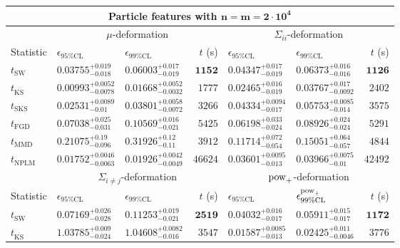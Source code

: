 \begin{tabular}{l|llr|llr}
	\toprule
	\multicolumn{7}{c}{{\bf Particle features with $\mathbf{n=m=2\cdot 10^{4}}$}} \\
	\toprule
	\multicolumn{1}{c}{} & \multicolumn{3}{c}{$\mu$-deformation} & \multicolumn{3}{c}{$\Sigma_{ii}$-deformation} \\
	Statistic & $\epsilon_{95\%\mathrm{CL}}$ & $\epsilon_{99\%\mathrm    {CL}}$ & $t$ (s) & $\epsilon_{95\%\mathrm{CL}}$ & $\epsilon_{99\%\mathrm{CL}}$ & $t$ (s) \\
	\midrule
	$t_{\mathrm{SW}}$ & $0.03755_{-0.018}^{+0.019}$ & $0.06003_{-0.019}^{+0.017}$ & ${\mathbf{1152}}$ & $0.04347_{-0.019}^{+0.017}$ & $0.06373_{-0.016}^{+0.016}$ & ${\mathbf{1126}}$ \\
	$t_{\overline{\mathrm{KS}}}$ & ${\mathbf{0.00993_{-0.0078}^{+0.0052}}}$ & ${\mathbf{0.01668_{-0.0032}^{+0.0052}}}$ & $1777$ & ${\mathbf{0.02465_{-0.019}^{+0.016}}}$ & ${\mathbf{0.03767_{-0.0092}^{+0.017}}}$ & $2402$ \\
	$t_{\mathrm{SKS}}$ & $0.02531_{-0.01}^{+0.0089}$ & $0.03801_{-0.0072}^{+0.0058}$ & $3266$ & $0.04334_{-0.017}^{+0.0094}$ & $0.05753_{-0.014}^{+0.0085}$ & $3575$ \\
	$t_{\mathrm{FGD}}$ & $0.07038_{-0.031}^{+0.025}$ & $0.10569_{-0.021}^{+0.016}$ & $5425$ & $0.06198_{-0.024}^{+0.033}$ & $0.08926_{-0.024}^{+0.024}$ & $5291$ \\
	$t_{\mathrm{MMD}}$ & $0.21075_{-0.096}^{+0.19}$ & $0.31926_{-0.11}^{+0.12}$ & $3912$ & $0.11714_{-0.054}^{+0.072}$ & $0.15051_{-0.057}^{+0.064}$ & $4844$ \\
\rowcolor{red!35}	$t_{\mathrm{NPLM}}$ & $0.01752_{-0.0063}^{+0.0046}$ & $0.01926_{-0.0049}^{+0.0042}$ & $46624$ & $0.03601_{-0.013}^{+0.0095}$ & $0.03966_{-0.01}^{+0.0075}$ & $42492$ \\
	\toprule
	\multicolumn{1}{c}{} & \multicolumn{3}{c}{$\Sigma_{i\neq j}$-deformation} & \multicolumn{3}{c}{$\rm{pow}_{+}$-deformation} \\
	Statistic & $\epsilon_{95\%\mathrm{CL}}$ & $\epsilon_{99\%\mathrm{CL}}$ & $t$ (s) & $\epsilon_{95\%\mathrm{CL}}$ & $\epsilon^{\rm   {pow}_{+}}_{99\%\mathrm{CL}}$ & $t$ (s) \\
	\midrule
	$t_{\mathrm{SW}}$ & $0.07169_{-0.028}^{+0.026}$ & $0.11253_{-0.021}^{+0.019}$ & ${\mathbf{2519}}$ & $0.04032_{-0.017}^{+0.016}$ & $0.05911_{-0.017}^{+0.015}$ & ${\mathbf{1172}}$ \\
	$t_{\overline{\mathrm{KS}}}$ & $1.03785_{-0.024}^{+0.009}$ & $1.04608_{-0.016}^{+0.0082}$ & $3547$ & ${\mathbf{0.01587_{-0.013}^{+0.0085}}}$ & ${\mathbf{0.02425_{-0.0046}^{+0.011}}}$ & $3776$ \\

\end{tabular}
